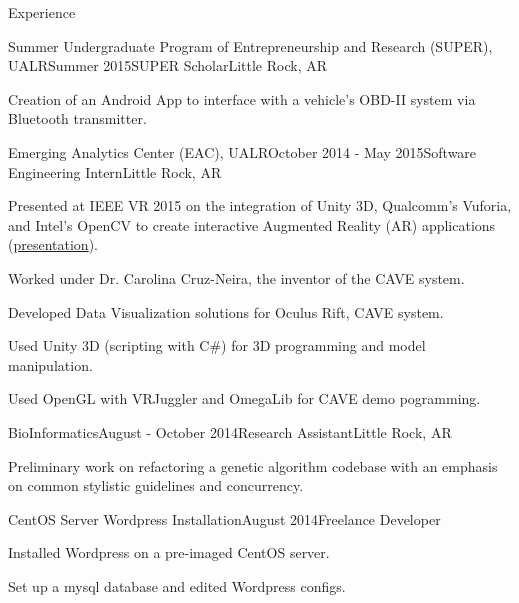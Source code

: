 \documentclass{resume} %
\begin{document}
\begin{rSection}{Experience}

\begin{rSubsection}{Summer Undergraduate Program of Entrepreneurship and Research (SUPER), \\
	UALR}{Summer 2015}{SUPER Scholar}{Little Rock, AR}
	\item Creation of an Android App to interface with a vehicle's OBD-II system via Bluetooth transmitter.
\end{rSubsection}

\begin{rSubsection}{Emerging Analytics Center (EAC), UALR}{October 2014 - May 2015}{Software Engineering Intern}{Little Rock, AR}
	\item Presented at IEEE VR 2015 on the integration of Unity 3D, Qualcomm's Vuforia, and Intel's OpenCV to create interactive Augmented Reality (AR) applications (\href{http://byteflame.org/ieee_vr/}{presentation}{}).
	\item Worked under Dr. Carolina Cruz-Neira, the inventor of the CAVE system.
	\item Developed Data Visualization solutions for Oculus Rift, CAVE system.
	\item Used Unity 3D (scripting with C\#) for 3D programming and model manipulation.
	\item Used OpenGL with VRJuggler and OmegaLib for CAVE demo pogramming.
\end{rSubsection}

\begin{rSubsection}{BioInformatics}{August - October 2014}{Research Assistant}{Little Rock, AR}

	\item Preliminary work on refactoring a genetic algorithm codebase with an emphasis on common stylistic guidelines and concurrency.
\end{rSubsection}

\begin{rSubsection}{CentOS Server Wordpress Installation}{August 2014}{Freelance Developer}{}

	\item Installed Wordpress on a pre-imaged CentOS server.
	\item Set up a mysql database and edited Wordpress configs.
\end{rSubsection}


\end{rSection}
\end{document}
